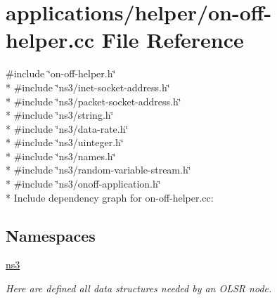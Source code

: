 \hypertarget{on-off-helper_8cc}{}\section{applications/helper/on-\/off-\/helper.cc File Reference}
\label{on-off-helper_8cc}
{\ttfamily \#include \char`\"{}on-\/off-\/helper.\+h\char`\"{}}\\*
{\ttfamily \#include \char`\"{}ns3/inet-\/socket-\/address.\+h\char`\"{}}\\*
{\ttfamily \#include \char`\"{}ns3/packet-\/socket-\/address.\+h\char`\"{}}\\*
{\ttfamily \#include \char`\"{}ns3/string.\+h\char`\"{}}\\*
{\ttfamily \#include \char`\"{}ns3/data-\/rate.\+h\char`\"{}}\\*
{\ttfamily \#include \char`\"{}ns3/uinteger.\+h\char`\"{}}\\*
{\ttfamily \#include \char`\"{}ns3/names.\+h\char`\"{}}\\*
{\ttfamily \#include \char`\"{}ns3/random-\/variable-\/stream.\+h\char`\"{}}\\*
{\ttfamily \#include \char`\"{}ns3/onoff-\/application.\+h\char`\"{}}\\*
Include dependency graph for on-\/off-\/helper.cc\+:
\subsection*{Namespaces}
\begin{DoxyCompactItemize}
\item 
 \hyperlink{namespacens3}{ns3}
\begin{DoxyCompactList}\small\item\em Here are defined all data structures needed by an O\+L\+SR node. \end{DoxyCompactList}\end{DoxyCompactItemize}
